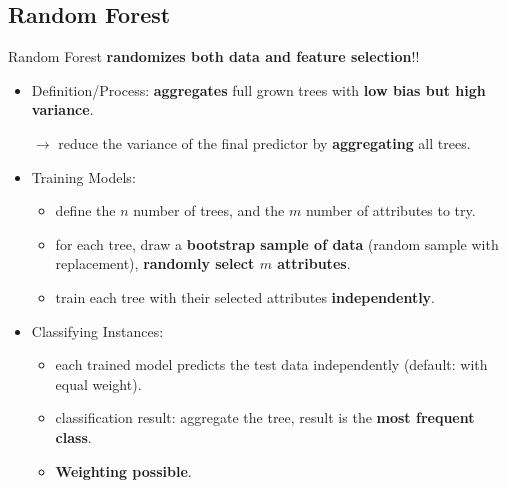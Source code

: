 \subsection{Random Forest}
Random Forest \textbf{randomizes both data and feature selection}!!
\begin{itemize}
	\item Definition/Process: \textbf{aggregates} full grown trees with \textbf{low bias but high variance}. 
	
	$\rightarrow$ reduce the variance of the final predictor by \textbf{aggregating} all trees.
	\item Training Models:
	\begin{itemize}
		\item define the $n$ number of trees, and the $m$ number of attributes to try.
		\item for each tree, draw a \textbf{bootstrap sample of data} (random sample with replacement), \textbf{randomly select $m$ attributes}.
		\item train each tree with their selected attributes \textbf{independently}.
	\end{itemize}

	\item Classifying Instances:
	\begin{itemize}
		\item each trained model predicts the test data independently (default: with equal weight). 
		\item classification result: aggregate the tree, result is the \textbf{most frequent class}.
		\item \textbf{Weighting possible}. 
	\end{itemize}

\end{itemize}

